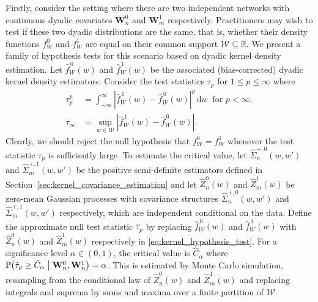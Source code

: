 \documentclass[11pt,lof]{puthesis}
\renewcommand{\P}{\ensuremath{\mathbb{P}}}
\newcommand{\R}{\ensuremath{\mathbb{R}}}
\newcommand{\bW}{\ensuremath{\mathbf{W}}}
\newcommand{\cW}{\ensuremath{\mathcal{W}}}
\newcommand{\diff}[1]{\,\mathrm{d}#1}
\theoremstyle{break}
\theoremstyle{proof}
\begin{document}
Firstly, consider the setting where there are two independent networks with
continuous dyadic covariates $\bW_n^0$ and $\bW_m^1$ respectively.
Practitioners may wish to test if these two dyadic distributions are the same,
that is, whether their density functions $f_W^0$ and $f_W^1$ are equal on their
common support $\cW \subseteq \R$. We present a family of hypothesis tests for
this scenario based on dyadic kernel density estimation. Let $\hat
f_W^{\,0}(w)$ and $\hat f_W^{\,1}(w)$ be the associated (bias-corrected) dyadic
kernel density estimators. Consider the test statistics $\tau_p$ for
$1 \leq p \leq \infty$ where
%
\begin{align}
  \nonumber
  \tau_p^p
  &= \int_{-\infty}^{\infty}
  \left| \hat f_W^{\,1}(w) - \hat f_W^{\,0}(w) \right|^p
  \diff w
  \ \text{ for } p < \infty, \\
  \label{eq:kernel_hypothesis_test}
  \tau_\infty
  &= \sup_{w \in \cW} \left| \hat f_W^{\,1}(w) - \hat f_W^{\,0}(w) \right|.
\end{align}
%
Clearly, we should reject the null hypothesis that $f_W^0 = f_W^1$ whenever the
test statistic $\tau_p$ is sufficiently large. To estimate the critical value,
let $\hat\Sigma_n^{+,0}(w, w')$ and $\hat\Sigma_m^{+,1}(w, w')$ be the positive
semi-definite estimators defined in
Section~\ref{sec:kernel_covariance_estimation} and
let $\hat Z^0_n(w)$ and $\hat Z^1_m(w)$ be zero-mean Gaussian processes with
covariance structures $\hat\Sigma_n^{+,0}(w, w')$ and
$\hat\Sigma_m^{+,1}(w, w')$ respectively, which are independent conditional on
the data. Define the approximate null test statistic $\hat \tau_p$ by replacing
$\hat f_W^{\,0}(w)$ and $\hat f_W^{\,1}(w)$ with $\hat Z^0_n(w)$ and
$\hat Z^1_m(w)$ respectively in \eqref{eq:kernel_hypothesis_test}.
For a significance level
$\alpha \in (0,1)$, the critical value is $\hat C_\alpha$ where
%
$\P \big(
  \hat \tau_p \geq \hat C_\alpha \bigm\vert \bW_n^0, \bW_n^1
\big) = \alpha$.
%
This is estimated by Monte Carlo simulation, resampling from the conditional
law of $\hat Z^0_n(w)$ and $\hat Z^1_m(w)$ and replacing integrals and suprema
by sums and maxima over a finite partition of $\cW$.
\end{document}
